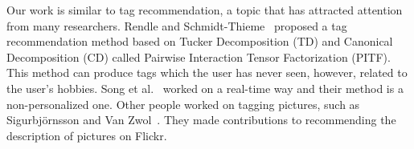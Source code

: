 %
%
%
Our work is similar to tag recommendation, a topic that has attracted
attention from many researchers.
Rendle and Schmidt-Thieme~ proposed a tag recommendation
method based on Tucker Decomposition (TD) and Canonical Decomposition (CD)
called Pairwise Interaction Tensor Factorization (PITF).
This method can produce tags which the
user has never seen, however, related to the user's hobbies.
Song et al.~ worked on a real-time way and their method
is a non-personalized one. Other people worked on tagging pictures, such
as Sigurbj{\"o}rnsson and Van Zwol~.
They made contributions to recommending the description of pictures on Flickr.

